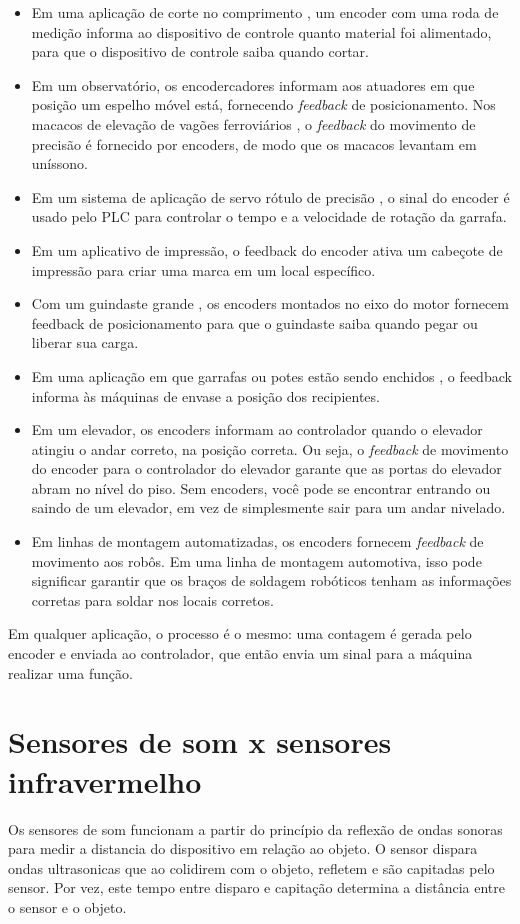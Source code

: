 \usepackage{}\documentclass[a4paper, 12pt]{article}
\begin{document}
\begin{itemize}
    \item Em uma aplicação de corte no comprimento , um encoder com uma roda de medição informa ao dispositivo de controle quanto material foi alimentado, para que o dispositivo de controle saiba quando cortar.
    \item Em um observatório, os encodercadores informam aos atuadores em que posição um espelho móvel está, fornecendo \textit{feedback} de posicionamento.
    Nos macacos de elevação de vagões ferroviários , o \textit{feedback} do movimento de precisão é fornecido por encoders, de modo que os macacos levantam em uníssono.
    \item Em um sistema de aplicação de servo rótulo de precisão , o sinal do encoder é usado pelo PLC para controlar o tempo e a velocidade de rotação da garrafa.
    \item Em um aplicativo de impressão, o feedback do encoder ativa um cabeçote de impressão para criar uma marca em um local específico.
    \item Com um guindaste grande , os encoders montados no eixo do motor fornecem feedback de posicionamento para que o guindaste saiba quando pegar ou liberar sua carga.
    \item Em uma aplicação em que garrafas ou potes estão sendo enchidos , o feedback informa às máquinas de envase a posição dos recipientes.
    \item Em um elevador, os encoders informam ao controlador quando o elevador atingiu o andar correto, na posição correta. Ou seja, o \textit{feedback} de movimento do encoder para o controlador do elevador garante que as portas do elevador abram no nível do piso. Sem encoders, você pode se encontrar entrando ou saindo de um elevador, em vez de simplesmente sair para um andar nivelado.
    \item Em linhas de montagem automatizadas, os encoders fornecem \textit{feedback} de movimento aos robôs. Em uma linha de montagem automotiva, isso pode significar garantir que os braços de soldagem robóticos tenham as informações corretas para soldar nos locais corretos.
\end{itemize}

Em qualquer aplicação, o processo é o mesmo: uma contagem é gerada pelo encoder e enviada ao controlador, que então envia um sinal para a máquina realizar uma função.

\section{Sensores de som x sensores infravermelho}
Os sensores de som funcionam a partir do princípio da reflexão de ondas sonoras para medir a distancia do dispositivo em relação ao objeto. O sensor dispara ondas ultrasonicas que ao colidirem com o objeto, refletem e são capitadas pelo sensor. Por vez, este tempo entre disparo e capitação determina a distância entre o sensor e o objeto.
\end{document}
